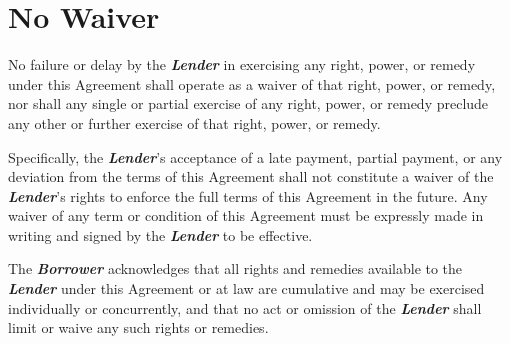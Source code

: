 
\section{No Waiver}
\label{sec:waiver}

No failure or delay by the \textbf{\textit{Lender}} in exercising any right, power, or remedy under this Agreement shall operate as a waiver of that right, power, or remedy, nor shall any single or partial exercise of any right, power, or remedy preclude any other or further exercise of that right, power, or remedy.

\vspace{0.3cm}

\noindent Specifically, the \textbf{\textit{Lender}}’s acceptance of a late payment, partial payment, or any deviation from the terms of this Agreement shall not constitute a waiver of the \textbf{\textit{Lender}}’s rights to enforce the full terms of this Agreement in the future. Any waiver of any term or condition of this Agreement must be expressly made in writing and signed by the \textbf{\textit{Lender}} to be effective.

\vspace{0.3cm}

\noindent The \textbf{\textit{Borrower}} acknowledges that all rights and remedies available to the \textbf{\textit{Lender}} under this Agreement or at law are cumulative and may be exercised individually or concurrently, and that no act or omission of the \textbf{\textit{Lender}} shall limit or waive any such rights or remedies.

